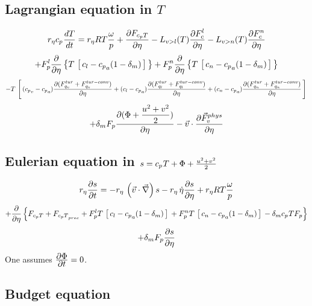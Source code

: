 \subsection*{Lagrangian equation in $T$}
{\scriptsize
\begin{displaymath}
     \re\cp{}\DerD{T}{t}=
        \re R T \frac{\omega}{p}
        +\DerP{F_{c_p T}}{\eta}
        -\lvl\DerP{\fcl{}}{\eta}
        -\lvn\DerP{\fcn{}}{\eta}
\end{displaymath}
\begin{displaymath}
                         +\fpl{}\DerP{}{\eta}\lb T\lc c_l-\cp{a}(1-\delta_m)\rc\rb
                         +\fpn{}\DerP{}{\eta}\lb T\lc c_n-\cp{a}(1-\delta_m)\rc\rb
\end{displaymath}
\begin{displaymath}
                         -T\lc
                         (\cp{v}-\cp{a})\DerP{(F_{q_v}^{tur}+F_{q_v}^{tur-conv})}{\eta}
                         +(c_l-\cp{a})\DerP{(F_{q_l}^{tur}+F_{q_l}^{tur-conv})}{\eta}
                         +(c_n-\cp{a})\DerP{(F_{q_n}^{tur}+F_{q_n}^{tur-conv})}{\eta}
                         \rc
\end{displaymath}
\begin{equation}\label{LagT}
                         +\delta_m\fp{}\DerP{(\Phi+\ec)}{\eta}
                         -\vec v\cdot\DerP{\vec F_v^{phys}}{\eta}
\end{equation}
}
\subsection*{Eulerian equation in $s=\cp{} T+\Phi+\ec$}
\begin{displaymath}
       \re\DerP{s}{t}=-\re\, \lp\vec{v}\cdot\grad\rp s-\re\, \dot{\eta}\DerP{s}{\eta}
                      +\re R T \frac{\omega}{p}
\end{displaymath}
\begin{displaymath}
  +\DerP{}{\eta}\lb F_{c_p T} + \fcptp{}
  + \fpl{} T \lc c_l - \cp{a} (1-\delta_m)\rc 
  + \fpn{} T \lc c_n - \cp{a} (1-\delta_m)\rc
  -\delta_m\cp{} T \fp{}\rb
\end{displaymath}
\begin{equation}\label{Eulh}
  +\delta_m\fp{}\DerP{s}{\eta}
\end{equation}
One assumes $\DerP{\Phi}{t}=0$.

\subsection*{Budget equation}

